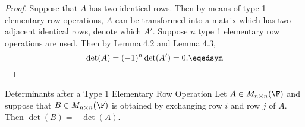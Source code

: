 \documentclass[linearalgebraI]{subfiles}
\begin{document}
    \begin{proof}
        Suppose that $A$ has two identical rows. Then by means of type 1 elementary row operations, $A$ can be transformed into a matrix which has two adjacent identical rows, denote which $A'$. Suppose $n$ type 1 elementary row operations are used. Then by Lemma 4.2 and Lemma 4.3,
        \begin{equation*}
            \det(A) = (-1)^n \det (A') = 0. \eqedsym
        \end{equation*}
    \end{proof}

    \clearpage
    \begin{prop}{Determinants after a Type 1 Elementary Row Operation}
        Let $A\in M_{n\times n}(\F)$ and suppose that $B\in M_{n\times n}(\F)$ is obtained by exchanging row $i$ and row $j$ of $A$. Then $\det(B) = -\det(A)$.
    \end{prop}
\end{document}
